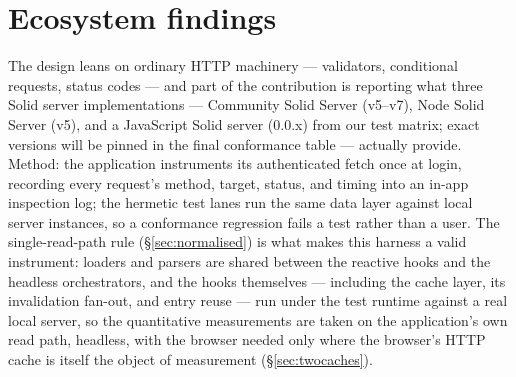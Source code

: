\documentclass[11pt,a4paper]{article}
\theoremstyle{remark}
\begin{document}
\section{Ecosystem findings}\label{sec:findings}

The design leans on ordinary HTTP machinery --- validators, conditional
requests, status codes --- and part of the contribution is reporting what three
Solid server implementations --- Community Solid Server (v5--v7), Node Solid
Server (v5), and a JavaScript Solid server (0.0.x) from our test matrix; exact
versions will be pinned in the final conformance table --- actually provide. Method: the
application instruments its authenticated fetch once at login, recording every
request's method, target, status, and timing into an in-app inspection log; the
hermetic test lanes run the same data layer against local server instances, so
a conformance regression fails a test rather than a user. The single-read-path
rule (\S\ref{sec:normalised}) is what makes this harness a valid instrument:
loaders and parsers are shared between the reactive hooks and the headless
orchestrators, and the hooks themselves --- including the cache layer, its
invalidation fan-out, and entry reuse --- run under the test runtime against a
real local server, so the quantitative measurements are taken on the
application's own read path, headless, with the browser needed only where the
browser's HTTP cache is itself the object of measurement
(\S\ref{sec:twocaches}).
\end{document}
